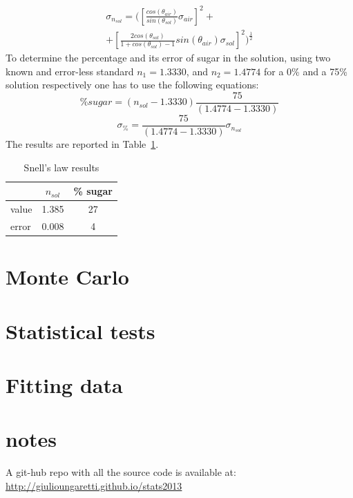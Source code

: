 \documentclass[twocolumn]{article}
\begin{document}
	\begin{multline}
	\sigma_{n_{sol}} = (\left[\frac{cos(\theta_{air})}{sin(\theta_{sol})}  \sigma_{air} \right]^2 + \\
	+ \left[ \frac{2 cos(\theta_{sol})}{1+cos(\theta_{sol})-1}  sin(\theta_{air}) \sigma_{sol}  \right] ^2 )^{\frac{1}{2}}
	\end{multline} 
	To determine the percentage and its error of sugar in the solution, using two known and error-less standard $n_1 = 1.3330$, and $n_2 = 1.4774$ for a  0\% and a 75\% solution respectively one has to use the following equations:
	\begin{equation}
	\% sugar = ( n_{sol} - 1.3330) \frac{75}{ (1.4774- 1.3330)}
	\end{equation}
	\begin{equation}
		\sigma_{\%} = \frac{75}{ (1.4774- 1.3330)} \sigma_{n_{sol}}
	\end{equation}
	The results are reported in Table~\ref{tab:snell}.
	\begin{table}[h!]
		\caption{Snell's law results}
		\label{tab:snell}
		\begin{center}
			\begin{tabular}{l|cc}
			\hline

			\hline
			\textbf{} & \textbf {$n_{sol}$ } & \textbf{ \% sugar} \\
			\hline
				value & 1.385  & 27 \\
				error & 0.008 & 4 \\
			\hline

			\hline
			\end{tabular}
		\end{center}
	\end{table}

\section{Monte Carlo} %
\label{sec:monte_carlo}


\section{Statistical tests} %
\label{sec:statistical_tests}



\section{Fitting data} %
\label{sec:fitting_data}

\section{notes}
A git-hub repo with all the source code is available at:
\url{http://giulioungaretti.github.io/stats2013}
\end{document}
